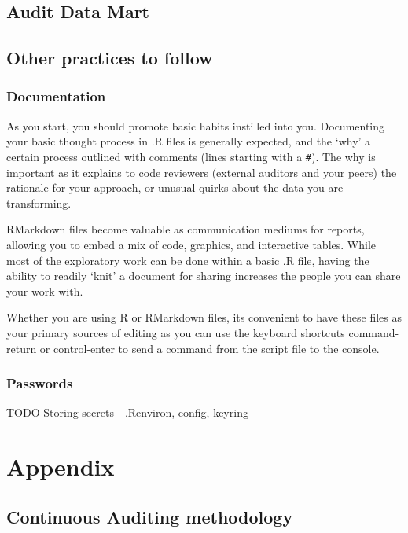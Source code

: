 \documentclass[
]{book}
\begin{document}
\hypertarget{applied-adw}{%
\chapter{Audit Data Mart}\label{applied-adw}}

\hypertarget{other-practices-to-follow}{%
\chapter{Other practices to follow}\label{other-practices-to-follow}}

\hypertarget{documentation}{%
\section{Documentation}\label{documentation}}

As you start, you should promote basic habits instilled into you. Documenting your basic thought process in .R files is generally expected, and the `why' a certain process outlined with comments (lines starting with a \texttt{\#}). The why is important as it explains to code reviewers (external auditors and your peers) the rationale for your approach, or unusual quirks about the data you are transforming.

RMarkdown files become valuable as communication mediums for reports, allowing you to embed a mix of code, graphics, and interactive tables. While most of the exploratory work can be done within a basic .R file, having the ability to readily `knit' a document for sharing increases the people you can share your work with.

Whether you are using R or RMarkdown files, its convenient to have these files as your primary sources of editing as you can use the keyboard shortcuts command-return or control-enter to send a command from the script file to the console.

\hypertarget{passwords}{%
\section{Passwords}\label{passwords}}

TODO Storing secrets - .Renviron, config, keyring

\hypertarget{part-appendix}{%
\part{Appendix}\label{part-appendix}}

\hypertarget{appendixct}{%
\chapter{Continuous Auditing methodology}\label{appendixct}}
\end{document}
